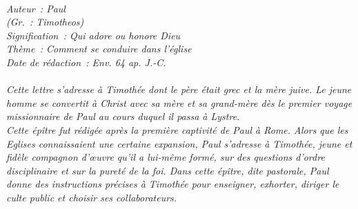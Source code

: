 \BFont
\noindent\hrulefill
{\footnotesize
\textit{
\bigskip
{\centering{}
\\Auteur~: Paul
\\(Gr.~: Timotheos)
\\Signification~: Qui adore ou honore Dieu
\\Thème~: Comment se conduire dans l'église
\\Date de rédaction~: Env. 64 ap. J.-C.\\}
}
\textit{
\\Cette lettre s'adresse à Timothée dont le père était grec et la mère juive. Le jeune homme se convertit à Christ avec sa mère et sa grand-mère dès le premier voyage missionnaire de Paul au cours duquel il passa à Lystre.
\\Cette épître fut rédigée après la première captivité de Paul à Rome. Alors que les Eglises connaissaient une certaine expansion, Paul s'adresse à Timothée, jeune et fidèle compagnon d'œuvre qu'il a lui-même formé, sur des questions d'ordre disciplinaire et sur la pureté de la foi. Dans cette épître, dite pastorale, Paul donne des instructions précises à Timothée pour enseigner, exhorter, diriger le culte public et choisir ses collaborateurs.\bigskip
}
}
\par\nobreak\noindent\hrulefill
